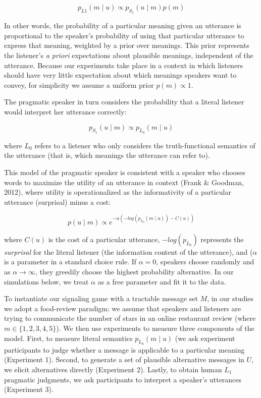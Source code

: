 \documentclass[10pt, letterpaper]{article}
\begin{document}
\[p_{L1}(m \mid u) \propto p_{S_1} (u \mid m) p(m)\]

\noindent In other words, the probability of a particular meaning given
an utterance is proportional to the speaker's probability of using that
particular utterance to express that meaning, weighted by a prior over
meanings. This prior represents the listener's \emph{a priori}
expectations about plausible meanings, independent of the utterance.
Because our experiments take place in a context in which listeners
should have very little expectation about which meanings speakers want
to convey, for simplicity we assume a uniform prior \(p(m) \propto 1\).

The pragmatic speaker in turn considers the probability that a literal
listener would interpret her utterance correctly:

\[ p_{S_1} (u \mid m) \propto p_{L_0} (m \mid u)\]

\noindent where \(L_0\) refers to a listener who only considers the
truth-functional semantics of the utterance (that is, which meanings the
utterance can refer to).

This model of the pragmatic speaker is consistent with a speaker who
chooses words to maximize the utility of an utterance in context (Frank
\& Goodman, 2012), where utility is operationalized as the informativity
of a particular utterance (surprisal) minus a cost:

\[p(u \mid m) \propto e^{-\alpha(-log(p_{L_0}(m \mid u)) - C(u))}\]

\noindent where \(C(u)\) is the cost of a particular utterance,
\(-log(p_{L_0})\) represents the \emph{surprisal} for the literal
listener (the information content of the utterance), and (\(\alpha\) is
a parameter in a standard choice rule. If \(\alpha=0\), speakers choose
randomly and as \(\alpha \rightarrow \infty\), they greedily choose the
highest probability alternative. In our simulations below, we treat
\(\alpha\) as a free parameter and fit it to the data.

To instantiate our signaling game with a tractable message set \(M\), in
our studies we adopt a food-review paradigm: we assume that speakers and
listeners are trying to communicate the number of stars in an online
restaurant review (where \(m \in \{1, 2, 3, 4, 5\}\)). We then use
experiments to measure three components of the model. First, to measure
literal semantics \({p_{L_0} (m \mid u)}\) (we ask experiment
participants to judge whether a message is applicable to a particular
meaning (Experiment 1). Second, to generate a set of plausible
alternative messages in \(U\), we elicit alternatives directly
(Experiment 2). Lastly, to obtain human \(L_1\) pragmatic judgments, we
ask participants to interpret a speaker's utterances (Experiment 3).
\end{document}
